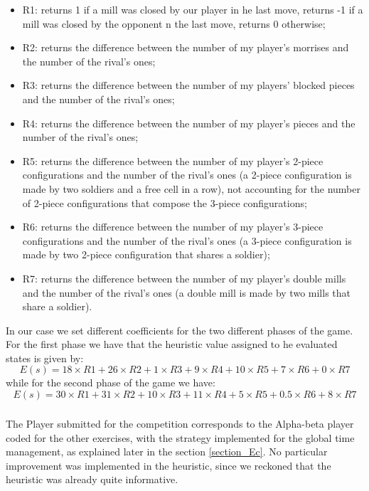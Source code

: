 \begin{itemize}
    \item R1: returns 1 if a mill was closed by our player in he last move, returns -1 if a mill was closed by the opponent n the last move, returns 0 otherwise;
    \item R2: returns the difference between the number of my player's morrises and the number of the rival's ones;
    \item R3: returns the difference between the number of my players' blocked pieces and the number of the rival's ones;
    \item R4: returns the difference between the number of my player's pieces and the number of the rival's ones;
    \item R5: returns the difference between the number of my player's 2-piece configurations and the number of the rival's ones (a 2-piece configuration is made by two soldiers and a free cell in a row), not accounting for the number of 2-piece configurations that compose the 3-piece configurations;
    \item R6: returns the difference between the number of my player's 3-piece configurations and the number of the rival's ones (a 3-piece configuration is made by two 2-piece configuration that shares a soldier);
    \item R7: returns the difference between the number of my player's double mills and the number of the rival's ones (a double mill is made by two mills that share a soldier).
\end{itemize}

In our case we set different coefficients for the two different phases of the game. For the first phase we have that the heuristic value assigned to he evaluated states is given by:
\begin{equation*}
    E(s) = 18 \times R1 + 26 \times R2 + 1 \times R3 + 9 \times R4 + 10 \times R5 + 7 \times R6 + 0 \times R7
\end{equation*}
while for the second phase of the game we have:
\begin{equation*}
    E(s) = 30 \times R1 + 31 \times R2 + 10 \times R3 + 11 \times R4 + 5 \times R5 + 0.5 \times R6 + 8 \times R7
\end{equation*}

\subsubsection{}
The Player submitted for the competition corresponds to the Alpha-beta player coded for the other exercises, with the strategy implemented for the global time management, as explained later in the section \ref{section_Ec}. No particular improvement was implemented in the heuristic, since we reckoned that the heuristic was already quite informative.

